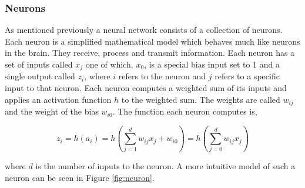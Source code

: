 \subsubsection{Neurons}\label{sec:neurons}

As mentioned previously a neural network consists of a collection of neurons.
Each neuron is a simplified mathematical model which behaves much like neurons
in the brain. They receive, process and transmit information. Each neuron has
a set of inputs called $x_{j}$ one of which, $x_{0}$, is a special bias input
set to 1 and a single output called $z_i$, where $i$ refers to the neuron and
$j$ refers to a specific input to that neuron. Each neuron computes a weighted
sum of its inputs and applies an activation function $h$ to the weighted sum.
\citep{Igel, Bishop} The weights are called $w_{ij}$ and the weight of the bias
$w_{i0}$. The function each neuron computes is,

\begin{equation}\label{eq:neuron}
    z_i = h(a_i) = h\left(
        \sum_{j = 1}^d w_{ij}x_j + w_{i0}
 \right) = h\left(
        \sum_{j = 0}^d w_{ij}x_j \right)
\end{equation}

where $d$ is the number of inputs to the neuron. A more intuitive model of such
a neuron can be seen in Figure \ref{fig:neuron}.


